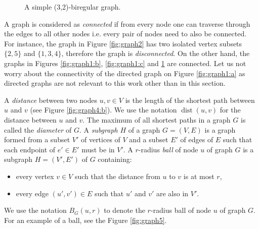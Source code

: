 \begin{figure}[H]
\centering
\caption{A simple (3,2)-biregular graph.\label{fig:graph3}}
\end{figure}


A graph is considered as \emph{connected} if from every node one can traverse through the edges to all other nodes i.e. every pair of nodes need to also be connected.
For instance, the graph in Figure \ref{fig:graph2} has two isolated vertex subsets $\{2, 5\}$ and $\{1, 3, 4\}$, therefore the graph is \emph{disconnected}.
On the other hand, the graphs in Figures \ref{fig:graph1:b}, \ref{fig:graph1:c} and \ref{fig:graph3} are connected.
Let us not worry about the connectivity of the directed graph on Figure \ref{fig:graph1:a} as directed graphs are not relevant to this work other than in this section.

A \emph{distance} between two nodes $u, v\in V$ is the length of the shortest path between $u$ and $v$ (see Figure \ref{fig:graph4:b}).
We use the notation $\operatorname{dist}(u, v)$ for the distance between $u$ and $v$.
The maximum of all shortest paths in a graph $G$ is called the \emph{diameter} of $G$.
A \emph{subgraph} $H$ of a graph $G=(V, E)$ is a graph formed from a subset $V'$ of vertices of $V$ and a subset $E'$ of edges of $E$ such that each endpoint of $e' \in E'$ must be in $V'$.
A $r$-radius \emph{ball} of node $u$ of graph $G$ is a subgraph $H=(V', E')$ of $G$ containing:
\begin{itemize}
  \item every vertex $v\in V$ such that the distance from $u$ to $v$ is at most $r$,
  \item every edge $(u', v') \in E$ such that $u'$ and $v'$ are also in $V'$.
\end{itemize}
We use the notation $B_G(u, r)$ to denote the $r$-radius ball of node $u$ of graph $G$.
For an example of a ball, see the Figure \ref{fig:graph5}.

